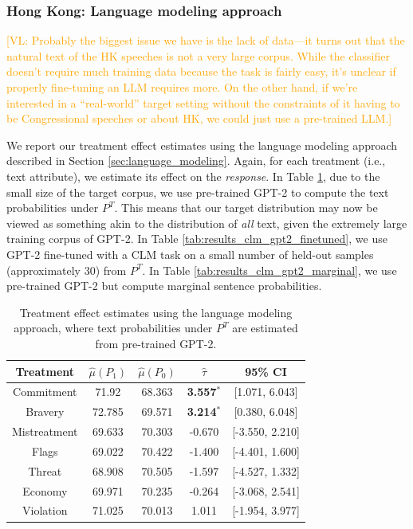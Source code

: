 \documentclass{article}
\newcommand{\vl}[1]{\textcolor{orange}{[VL: #1]}}
\begin{document}
\subsubsection{Hong Kong: Language modeling approach}

\vl{Probably the biggest issue we have is the lack of data---it turns out that the natural text of the HK speeches is not a very large corpus. While the classifier doesn't require much training data because the task is fairly easy, it's unclear if properly fine-tuning an LLM requires more.
\newline
\newline
On the other hand, if we're interested in a ``real-world'' target setting without the constraints of it having to be Congressional speeches or about HK, we could just use a pre-trained LLM.}

We report our treatment effect estimates using the language modeling approach described in Section \ref{sec:language_modeling}. Again, for each treatment (i.e., text attribute), we estimate its effect on the \textit{response}. In Table \ref{tab:results_clm_gpt2}, due to the small size of the target corpus, we use pre-trained GPT-2 \cite{radford2019language} to compute the text probabilities under $P^T$. This means that our target distribution may now be viewed as something akin to the distribution of \textit{all} text, given the extremely large training corpus of GPT-2. In Table \ref{tab:results_clm_gpt2_finetuned}, we use GPT-2 fine-tuned with a CLM task on a small number of held-out samples (approximately 30) from $P^T$. In Table \ref{tab:results_clm_gpt2_marginal}, we use pre-trained GPT-2 but compute marginal sentence probabilities.

\begin{table}[!ht]
    \centering
    \begin{tabular}{c|cccc}
        \toprule
        Treatment & $\hat{\mu}(P_1)$ & $\hat{\mu}(P_0)$ & $\hat{\tau}$ & 95\% CI \\
        \midrule
        Commitment & 71.92 & 68.363 & \textbf{\textcolor{green!50!black}{3.557$^*$}} & [1.071, 6.043] \\
        Bravery & 72.785 & 69.571 & \textbf{\textcolor{green!50!black}{3.214$^*$}} & [0.380, 6.048]  \\
        Mistreatment & 69.633 & 70.303 & \textcolor{red!80!black}{-0.670} & [-3.550, 2.210] \\
        Flags & 69.022 & 70.422 & \textcolor{red!80!black}{-1.400} & [-4.401, 1.600] \\
        Threat & 68.908 & 70.505 & \textcolor{red!80!black}{-1.597} & [-4.527, 1.332] \\
        Economy & 69.971 & 70.235 & \textcolor{red!80!black}{-0.264} & [-3.068, 2.541] \\
        Violation & 71.025 & 70.013 & \textcolor{green!50!black}{1.011} & [-1.954, 3.977] \\
        \bottomrule
    \end{tabular}
    \caption{Treatment effect estimates using the language modeling approach, where text probabilities under $P^T$ are estimated from pre-trained GPT-2.}
    \label{tab:results_clm_gpt2}
\end{table}
\end{document}

